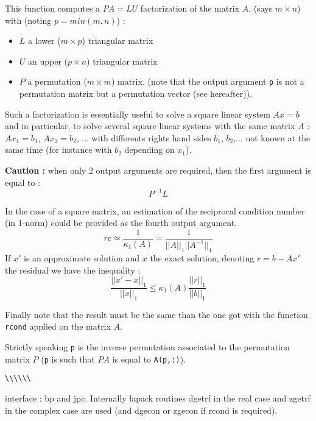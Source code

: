 \begin{mandescription}
This function computes a $P A = L U$ factorization of the matrix $A$, 
(says $m \times n$) with (noting $p = min(m,n)$) :
\begin{itemize}
\item $L$ a lower  ($m \times p$) triangular matrix
\item $U$ an upper  ($p \times n$) triangular matrix
\item $P$ a permutation  ($m \times m$) matrix.
      (note that the output argument \verb+p+ is not a permutation matrix
       but a permutation vector (see hereafter)). 
\end{itemize}
Such a factorization is essentially useful to solve a square linear
system $A x = b$ and in particular, to solve several square linear
systems with the same matrix $A$ : $Ax_1=b_1$, $Ax_2 = b_2$, ... with
differents rights hand sides $b_1$, $b_2$,... not known at the same
time (for instance with $b_2$ depending on $x_1$). 

{\bf Caution :} when only 2 output arguments are required, then the first argument is
equal to :
$$
P^{-1}L
$$



In the case of a square matrix, an estimation of the reciprocal
condition number (in 1-norm) could be provided as the fourth output argument.
$$
rc \simeq \frac{1}{\kappa_1(A)} = \frac{1}{||A||_1 ||A^{-1}||_1}
$$
If $x'$ is an approximate solution and $x$ the exact solution,
denoting $r = b - Ax'$ the residual we have the inequality :
$$
\frac{||x' - x||_1}{||x||_1} \le \kappa_1(A) \frac{||r||_1}{||b||_1}
$$
 
Finally note that the result must be the same than the one got 
with the function \verb+rcond+ applied on the matrix $A$.
 
Strictly speaking \verb+p+ is the inverse permutation associated
to the permutation matrix $P$ (\verb+p+ is such that $PA$ is equal 
to \verb+A(p,:)+).

\end{mandescription}

\begin{examples}
  \begin{program}\verb+\+\verb+\+\verb+\+\verb+\+\verb+\+\verb+\+
  \end{program}
\end{examples}

\begin{manseealso}
\end{manseealso}

\begin{authors}
   interface : bp and jpc. Internally lapack routines dgetrf in the
   real case and zgetrf in the complex case are used (and dgecon or zgecon if
   rcond is required).
\end{authors}
